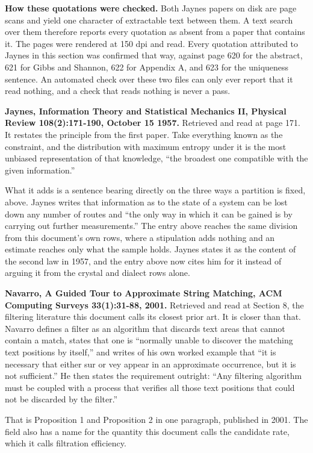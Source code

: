 \textbf{How these quotations were checked.} Both Jaynes papers on disk are page scans and yield one character of extractable text between them. A text search over them therefore reports every quotation as absent from a paper that contains it. The pages were rendered at 150 dpi and read. Every quotation attributed to Jaynes in this section was confirmed that way, against page 620 for the abstract, 621 for Gibbs and Shannon, 622 for Appendix A, and 623 for the uniqueness sentence. An automated check over these two files can only ever report that it read nothing, and a check that reads nothing is never a pass.

\textbf{Jaynes, Information Theory and Statistical Mechanics II, Physical Review 108(2):171-190, October 15 1957.} Retrieved and read at page 171. It restates the principle from the first paper. Take everything known as the constraint, and the distribution with maximum entropy under it is the most unbiased representation of that knowledge, ``the broadest one compatible with the given information.''

What it adds is a sentence bearing directly on the three ways a partition is fixed, above. Jaynes writes that information as to the state of a system can be lost down any number of routes and ``the only way in which it can be gained is by carrying out further measurements.'' The entry above reaches the same division from this document's own rows, where a stipulation adds nothing and an estimate reaches only what the sample holds. Jaynes states it as the content of the second law in 1957, and the entry above now cites him for it instead of arguing it from the crystal and dialect rows alone.

\textbf{Navarro, A Guided Tour to Approximate String Matching, ACM Computing Surveys 33(1):31-88, 2001.} Retrieved and read at Section 8, the filtering literature this document calls its closest prior art. It is closer than that. Navarro defines a filter as an algorithm that discards text areas that cannot contain a match, states that one is ``normally unable to discover the matching text positions by itself,'' and writes of his own worked example that ``it is necessary that either sur or vey appear in an approximate occurrence, but it is not sufficient.'' He then states the requirement outright: ``Any filtering algorithm must be coupled with a process that verifies all those text positions that could not be discarded by the filter.''

That is Proposition 1 and Proposition 2 in one paragraph, published in 2001. The field also has a name for the quantity this document calls the candidate rate, which it calls filtration efficiency.

